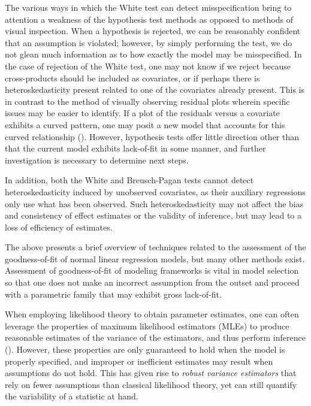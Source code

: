 \documentclass[12pt]{article} %
\theoremstyle{definition}
\begin{document}
		The various ways in which the White test can detect misspecification bring to attention a weakness of the hypothesis test methods as opposed to methods of visual inspection.
		When a hypothesis is rejected, we can be reasonably confident that an assumption is violated; however, by simply performing the test, we do not glean much information as to how exactly the
		model may be misspecified. In the case of rejection of the White test, one may not know if we reject because cross-products should be included as covariates, or if perhaps there is heteroskedasticity
		present related to one of the covariates already present. This is in contrast to the method of visually observing residual plots wherein specific issues may be easier to identify.
		If a plot of the residuals versus a covariate exhibits a curved pattern, one may posit a new model that accounts for this curved relationship (\cite{Miles}).
		However, hypothesis tests offer little direction other than that the current model exhibits lack-of-fit in some manner, and further investigation is necessary to determine next steps.

		In addition, both the White and Breusch-Pagan tests cannot detect heteroskedasticity induced by unobserved covariates, as their auxiliary regressions only use what has been observed. Such heteroskedasticity
		may not affect the bias and consistency of effect estimates or the validity of inference, but may lead to a loss of efficiency of estimates. 

		The above presents a brief overview of techniques related to the assessment of the goodness-of-fit of normal linear regression models, but many other methods exist. Assessment of goodness-of-fit
		of modeling frameworks is vital in model selection so that one does not make an incorrect assumption from the outset and proceed with a parametric family that may exhibit gross lack-of-fit.

		When employing likelihood theory to obtain parameter estimates, one can often leverage the properties of maximum likelihood estimators (MLEs) to produce reasonable estimates of the variance of the
		estimators, and thus perform inference (\cite{Millar}). However, these properties are only guaranteed to hold when the model is properly specified, and improper or inefficient estimates may result when assumptions
		do not hold. This has given rise to \textit{robust variance estimators} that rely on fewer assumptions than classical likelihood theory, yet can still quantify the variability of a statistic
		at hand.
\end{document}
